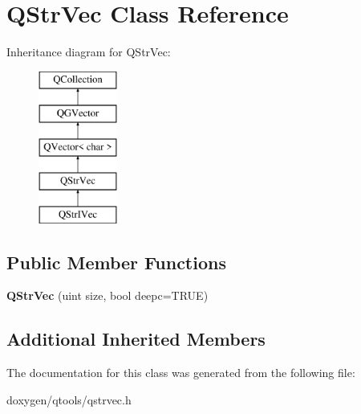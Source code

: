 \hypertarget{class_q_str_vec}{}\section{Q\+Str\+Vec Class Reference}
\label{class_q_str_vec}
Inheritance diagram for Q\+Str\+Vec\+:\begin{figure}[H]
\begin{center}
\leavevmode
\includegraphics[height=5.000000cm]{class_q_str_vec}
\end{center}
\end{figure}
\subsection*{Public Member Functions}
\begin{DoxyCompactItemize}
\item 
\mbox{\label{class_q_str_vec_a418fb05c2bafdcfc796f15976aefe900}} 
{\bfseries Q\+Str\+Vec} (uint size, bool deepc=T\+R\+UE)
\end{DoxyCompactItemize}
\subsection*{Additional Inherited Members}


The documentation for this class was generated from the following file\+:\begin{DoxyCompactItemize}
\item 
doxygen/qtools/qstrvec.\+h\end{DoxyCompactItemize}
